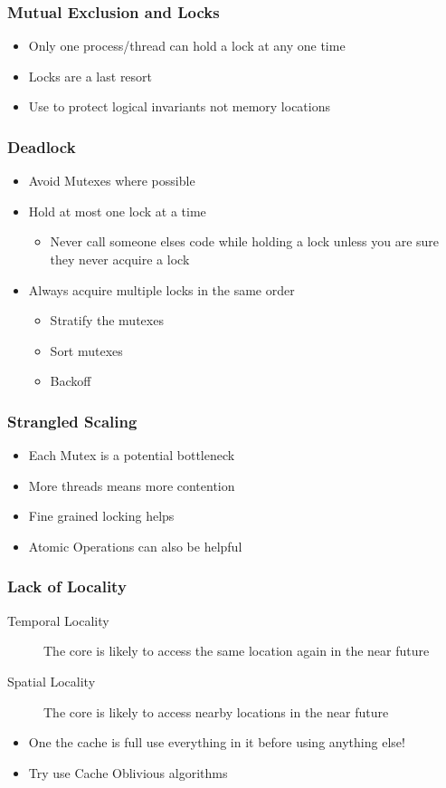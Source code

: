 \documentclass{beamer}
\begin{document}
\begin{frame}
	\frametitle{Mutual Exclusion and Locks}
  
\begin{itemize}
	\item Only one process/thread can hold a lock at any one time
	\item Locks are a last resort
	\item Use to protect logical invariants not memory locations
\end{itemize}


	
\end{frame}
\begin{frame}
	\frametitle{Deadlock}
\begin{itemize}
	\item Avoid Mutexes where possible
	\item Hold at most one lock at a time
	\begin{itemize}
	\item Never call someone elses code while holding a lock unless you are sure they never acquire a lock
	\end{itemize}
	\item Always acquire multiple locks in the same order
		\begin{itemize}
	\item Stratify the mutexes
	\item Sort mutexes
	\item Backoff
	\end{itemize}
\end{itemize}
	
\end{frame}

\begin{frame}
	\frametitle{Strangled Scaling}
	\begin{itemize}
	\item Each Mutex is a potential bottleneck
	\item More threads means more contention
	\item Fine grained locking helps
	\item Atomic Operations can also be helpful
	\end{itemize}
\end{frame}

\begin{frame}
	\frametitle{Lack of Locality}
	\begin{description}
		\item[Temporal Locality]
The core is likely to access the same location again in the near future
\item[Spatial Locality]
The core is likely to access nearby locations in the near future
	\end{description}
	\begin{itemize}
	\item One the cache is full use everything in it before using anything else!
	\item Try use Cache Oblivious algorithms
	\end{itemize}

\end{frame}
\end{document}
